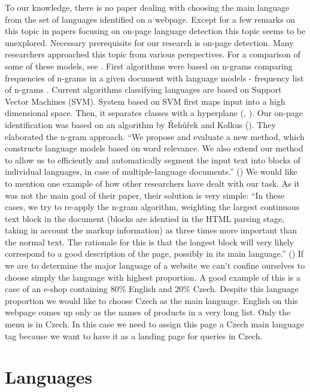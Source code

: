 \documentclass{acm_proc_article-sp}
\begin{document}
  To our knowledge, there is no paper dealing with choosing the main language from the set
  of languages identified on a webpage. Except for a few remarks on this topic in papers 
  focusing on on-page language detection this topic seems to be unexplored. 
  Necessary prerequisite for our research is on-page detection. Many researchers approached this topic
  from various perspectives. For a comparison of some of these models, see \cite{Baldwin:shortlong}. 
  First algorithms were based on n-grams comparing frequencies of n-grams in a given document with 
  language models - frequency list of n-grams \cite{trenkle:ngram}. Current algorithms classifying languages 
  are based on Support Vector Machines (SVM). System based on SVM first maps input into a high dimensional space. 
  Then, it separates classes with a hyperplane (\cite{Campbell:supportvector}, \cite{Lodhi:textclass}).
  Our on-page identification was based on an algorithm by Řehůřek and Kolkus (\cite{Rehurek:languageidentification}).  They elaborated the n-gram approach. 
  “We propose and evaluate a new method, which constructs language models based on word relevance. We also 
  extend our method to allow us to efficiently and automatically segment the input text into blocks of individual 
  languages, in case of multiple-language documents.” (\cite{Rehurek:languageidentification})
  We would like to mention one example of how other researchers have dealt with our task. As it was not the main goal of 
  their paper, their solution is very simple:
  “In these cases, we try to re-apply the n-gram algorithm, weighting the largest continuous text block in the document 
  (blocks are identied in the HTML parsing stage, taking in account the markup information) as three times more important 
  than the normal text. The rationale for this is that the longest block will very likely correspond to a good description 
  of the page, possibly in its main language.” (\cite{Martins:langidentweb}) If we are to determine the major language of a website 
  we can’t confine ourselves to choose simply the language with highest proportion. A good example of this is a case of an e-shop 
  containing 80\% English and 20\% Czech. Despite this language proportion we would like to choose Czech as the main language. 
  English on this webpage comes up only as the names of products in a very long list. Only the menu is in Czech. In this case 
  we need to assign this page a Czech main language tag because we want to have it as a landing page for queries in Czech.

\section{Languages}
\end{document}
